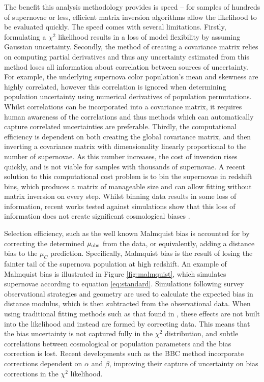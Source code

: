\documentclass[a4paper,fleqn,usenatbib]{emulateapj}
\begin{document}
The benefit this analysis methodology provides is speed -- for samples of hundreds of supernovae or less, efficient matrix inversion algorithms allow the likelihood to be evaluated quickly. The speed comes with several limitations. Firstly, formulating a $\chi^2$ likelihood results in a loss of model flexibility by assuming Gaussian uncertainty. Secondly, the method of creating a covariance matrix relies on computing partial derivatives and thus any uncertainty estimated from this method loses all information about correlation between sources of uncertainty. For example, the underlying supernova color population's mean and skewness are highly correlated, however this correlation is ignored when determining population uncertainty using numerical derivatives of population permutations. Whilst correlations can be incorporated into a covariance matrix, it requires human awareness of the correlations and thus methods which can automatically capture correlated uncertainties are preferable. Thirdly, the computational efficiency is dependent on both creating the global covariance matrix, and then inverting a covariance matrix with dimensionality linearly proportional to the number of supernovae. As this number increases, the cost of inversion rises quickly, and is not viable for samples with thousands of supernovae. A recent solution to this computational cost problem is to bin the supernovae in redshift bins, which produces a matrix of manageable size and can allow fitting without matrix inversion on every step. Whilst binning data results in some loss of information, recent works tested against simulations show that this loss of information does not create significant cosmological biases \citep{Scolnic2016, Kessler2017}.

Selection efficiency, such as the well known Malmquist bias \citep{MalmquistK.G.1922} is accounted for by correcting the determined $\mu_{\rm obs}$ from the data, or equivalently, adding a distance bias to the $\mu_C$ prediction. Specifically, Malmquist bias is the result of losing the fainter tail of the supernova population at high redshift. An example of Malmquist bias is illustrated in Figure \ref{fig:malmquist}, which simulates supernovae according to equation \eqref{eq:standard}. Simulations following survey observational strategies and geometry are used to calculate the expected bias in distance modulus, which is then subtracted from the observational data. When using traditional fitting methods such as that found in \citet{Betoule2014}, these effects are not built into the likelihood and instead are formed by correcting data. This means that the bias uncertainty is not captured fully in the $\chi^2$ distribution, and subtle correlations between cosmological or population parameters and the bias correction is lost. Recent developments such as the BBC method \citep{Kessler2017} incorporate corrections dependent on $\alpha$ and $\beta$, improving their capture of uncertainty on bias corrections in the $\chi^2$ likelihood.
\end{document}
